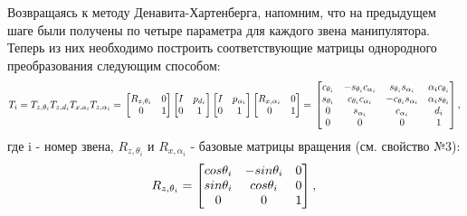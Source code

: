 \hspace*{\parindent} Возвращаясь к методу Денавита-Хартенберга, напомним, что на предыдущем шаге были получены по четыре параметра для каждого звена манипулятора. Теперь из них необходимо построить соответствующие матрицы однородного преобразования следующим способом:\\
\begin{equation}\label{eq:model}
T_i = T_{z,{\theta_i}} T_{z,{d_i}} T_{x,{a_i}} T_{z,{\alpha_i}} = \\
     \begin{bmatrix}
      R_{z,{\theta_i}} & 0\\
      0 & 1 \\
    \end{bmatrix}
    \begin{bmatrix}
      I & p_{d_i}\\
      0 & 1 \\
    \end{bmatrix}
    \begin{bmatrix}
      I & p_{\alpha_i}\\
      0 & 1 \\
    \end{bmatrix}
    \begin{bmatrix}
      R_{x,{\alpha_i}} & 0\\
      0 & 1 \\
    \end{bmatrix}
    = \\
     \begin{bmatrix}
      c_{\theta_i} & -s_{\theta_i}c_{\alpha_i} & s_{\theta_i}s_{\alpha_i} & \alpha_i c_{\theta_i} \\
      s_{\theta_i} & c_{\theta_i}c_{\alpha_i} & -c_{\theta_i}s_{\alpha_i} & \alpha_i s_{\theta_i} \\
      0 & s_{\alpha_i} & c_{\alpha_i} & d_i\\
      0 & 0 & 0 & 1\\
    \end{bmatrix}
    ,\\
\end{equation} 
где i - номер звена,  $R_{z,{\theta_i}}$ и $R_{x,{\alpha_i}}$  - базовые матрицы вращения (см. свойство №3):
\begin{equation}\label{eq:model}
R_{z, \theta_i} = 
     \begin{bmatrix}
    cos\theta_i & -sin\theta_i & 0\\
    sin\theta_i & cos\theta_i & 0\\
    0 & 0 & 1\\
    \end{bmatrix}
    , \\
\end{equation} 

